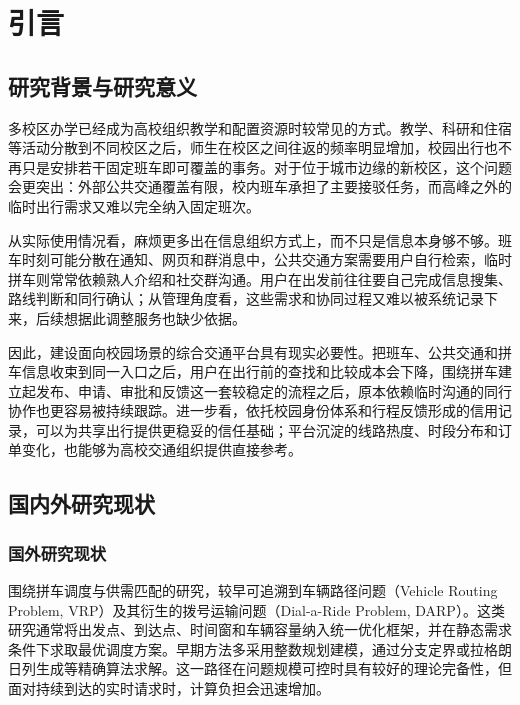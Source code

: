 ﻿\chapter{引言}\label{chap:introduction}

\section{研究背景与研究意义}

多校区办学已经成为高校组织教学和配置资源时较常见的方式。教学、科研和住宿等活动分散到不同校区之后，师生在校区之间往返的频率明显增加，校园出行也不再只是安排若干固定班车即可覆盖的事务。对于位于城市边缘的新校区，这个问题会更突出：外部公共交通覆盖有限，校内班车承担了主要接驳任务，而高峰之外的临时出行需求又难以完全纳入固定班次。

从实际使用情况看，麻烦更多出在信息组织方式上，而不只是信息本身够不够。班车时刻可能分散在通知、网页和群消息中，公共交通方案需要用户自行检索，临时拼车则常常依赖熟人介绍和社交群沟通。用户在出发前往往要自己完成信息搜集、路线判断和同行确认；从管理角度看，这些需求和协同过程又难以被系统记录下来，后续想据此调整服务也缺少依据。

因此，建设面向校园场景的综合交通平台具有现实必要性。把班车、公共交通和拼车信息收束到同一入口之后，用户在出行前的查找和比较成本会下降，围绕拼车建立起发布、申请、审批和反馈这一套较稳定的流程之后，原本依赖临时沟通的同行协作也更容易被持续跟踪。进一步看，依托校园身份体系和行程反馈形成的信用记录，可以为共享出行提供更稳妥的信任基础；平台沉淀的线路热度、时段分布和订单变化，也能够为高校交通组织提供直接参考。


\section{国内外研究现状}

\subsection{国外研究现状}

围绕拼车调度与供需匹配的研究，较早可追溯到车辆路径问题（Vehicle Routing Problem, VRP）及其衍生的拨号运输问题（Dial-a-Ride Problem, DARP）\cite{laporte1992,cordeau2007}。这类研究通常将出发点、到达点、时间窗和车辆容量纳入统一优化框架，并在静态需求条件下求取最优调度方案。早期方法多采用整数规划建模，通过分支定界\cite{huang2014}或拉格朗日列生成等精确算法求解\cite{baldacci2004}。这一路径在问题规模可控时具有较好的理论完备性，但面对持续到达的实时请求时，计算负担会迅速增加。

